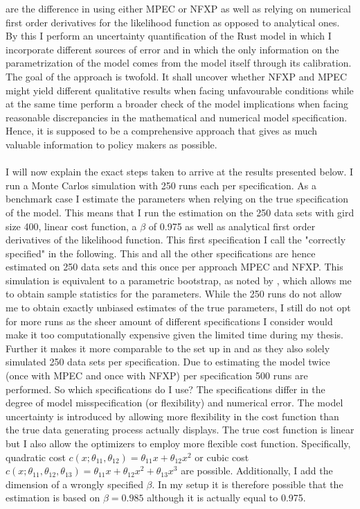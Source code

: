 are the difference in using either MPEC or NFXP as well as relying on numerical first order derivatives for the likelihood function as opposed to analytical ones. By this I perform an uncertainty quantification of the Rust model in which I incorporate different sources of error and in which the only information on the parametrization of the model comes from the model itself through its calibration. The goal of the approach is twofold. It shall uncover whether NFXP and MPEC might yield different qualitative results when facing unfavourable conditions while at the same time perform a broader check of the model implications when facing reasonable discrepancies in the mathematical and numerical model specification. Hence, it is supposed to be a comprehensive approach that gives as much valuable information to policy makers as possible. \paragraph{}

I will now explain the exact steps taken to arrive at the results presented below. I run a Monte Carlos simulation with 250 runs each per specification. As a benchmark case I estimate the parameters when relying on the true specification of the model. This means that I run the estimation on the 250 data sets with gird size 400, linear cost function, a $\beta$ of 0.975 as well as analytical first order derivatives of the likelihood function. This first specification I call the "correctly specified" in the following. This and all the other specifications are hence estimated on 250 data sets and this once per approach MPEC and NFXP. This simulation is equivalent to a parametric bootstrap, as noted by \cite{Su.Judd.2012}, which allows me to obtain sample statistics for the parameters. While the 250 runs do not allow me to obtain exactly unbiased estimates of the true parameters, I still do not opt for more runs as the sheer amount of different specifications I consider would make it too computationally expensive given the limited time during my thesis. Further it makes it more comparable to the set up in \cite{Iskhakov.2016} and \cite{Su.Judd.2012} as they also solely simulated 250 data sets per specification. Due to estimating the model twice (once with MPEC and once with NFXP) per specification 500 runs are performed. So which specifications do I use? The specifications differ in the degree of model misspecification (or flexibility) and numerical error. The model uncertainty is introduced by allowing more flexibility in the cost function than the true data generating process actually displays. The true cost function is linear but I also allow the optimizers to employ more flexible cost function. Specifically, quadratic cost $c(x; \theta_{11}, \theta_{12}) = \theta_{11}x + \theta_{12}x^2$ or cubic cost $c(x; \theta_{11}, \theta_{12}, \theta_{13}) = \theta_{11}x + \theta_{12}x^2 + \theta_{13}x^3$ are possible. Additionally, I add the dimension of a wrongly specified $\beta$. In my setup it is therefore possible that the estimation is based on $\beta = 0.985$ although it is actually equal to 0.975.

